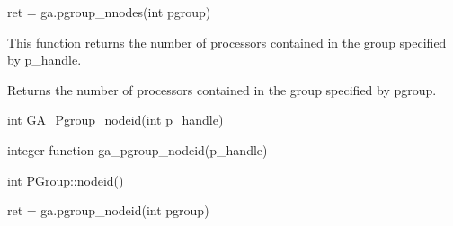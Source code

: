 \documentclass[12pt]{article}
\begin{document}
\begin{pyapi}
\begin{pycode}
ret = ga.pgroup_nnodes(int pgroup)
\end{pycode}
\begin{funcargs}
\end{funcargs}
\end{pyapi}

\local

\begin{desc}
This function returns the number of processors contained in the group specified
by p_handle.

Returns the number of processors contained in the group specified by
pgroup.
\end{desc}



\begin{capi}
\begin{ccode}
int GA_Pgroup_nodeid(int p_handle)
\end{ccode}
\begin{funcargs}
\end{funcargs}
\end{capi}

\begin{fapi}
\begin{fcode}
integer function ga_pgroup_nodeid(p_handle)
\end{fcode}
\begin{funcargs}
\end{funcargs}
\end{fapi}

\begin{cxxapi}
\begin{cxxcode}
int PGroup::nodeid()
\end{cxxcode}
\end{cxxapi}

\begin{pyapi}
\begin{pycode}
ret = ga.pgroup_nodeid(int pgroup)
\end{pycode}
\begin{funcargs}
\end{funcargs}
\end{pyapi}
\end{document}
